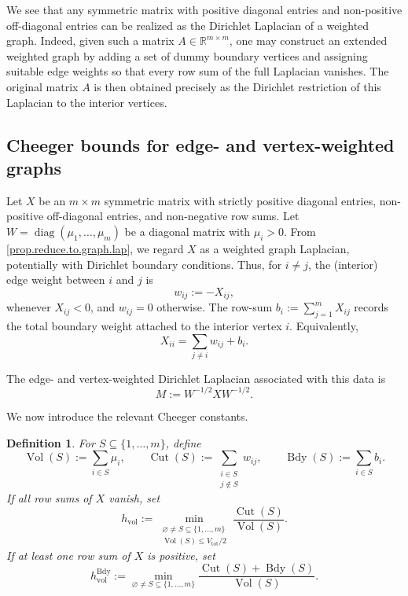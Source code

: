 \documentclass{article}
\newtheorem{definition}{Definition}[section]
\begin{document}
We see that 
any symmetric matrix with positive diagonal entries and non-positive 
off-diagonal entries can be realized as the Dirichlet Laplacian of a 
weighted graph. Indeed, given such a matrix $A \in \mathbb{R}^{m \times m}$, 
one may construct an extended weighted graph by adding a set of dummy 
boundary vertices and assigning suitable edge weights so that every row sum 
of the full Laplacian vanishes. The original matrix $A$ is then obtained 
precisely as the Dirichlet restriction of this Laplacian to the interior 
vertices. 

\subsection{Cheeger bounds for edge- and vertex-weighted graphs}
Let \(X\) be an \(m\times m\) symmetric matrix with strictly positive diagonal entries, non-positive off-diagonal entries, and non-negative row sums. Let \(W=\operatorname{diag}(\mu_1,\ldots,\mu_m)\) be a diagonal matrix with \(\mu_i>0\). From \cref{prop.reduce.to.graph.lap}, we regard \(X\) as a weighted graph Laplacian, potentially with Dirichlet boundary conditions. Thus, for \(i\neq j\), the (interior) edge weight between \(i\) and \(j\) is
\[
w_{ij}:=-X_{ij},
\]
whenever \(X_{ij}<0\), and \(w_{ij}=0\) otherwise. The row-sum $
b_i:=\sum_{j=1}^m X_{ij}$ records the total boundary weight attached to the interior vertex \(i\). Equivalently,
\[
X_{ii}=\sum_{j\neq i}w_{ij}+b_i.
\]

The edge- and vertex-weighted Dirichlet Laplacian associated with this data is
\[
M:=W^{-1/2}XW^{-1/2}.
\]

We now introduce the relevant Cheeger constants. 

\begin{definition}

For \(S\subseteq \{1,\ldots,m\}\), define
\[
\operatorname{Vol}(S):=\sum_{i\in S}\mu_i,\qquad
\operatorname{Cut}(S):=\sum_{\substack{i\in S\\ j\notin S}}w_{ij},\qquad
\operatorname{Bdy}(S):=\sum_{i\in S}b_i.
\]
If all row sums of \(X\) vanish, set
\[
h_{\mathrm{vol}}:=
\min_{\substack{\varnothing\neq S\subseteq \{1,\ldots,m\}\\ \operatorname{Vol}(S)\leq V_{\mathrm{tot}}/2}}
\frac{\operatorname{Cut}(S)}{\operatorname{Vol}(S)}.
\]
If at least one row sum of \(X\) is positive, set
\[
h_{\mathrm{vol}}^{\mathrm{Bdy}}:=
\min_{\varnothing\neq S\subseteq \{1,\ldots,m\}}
\frac{\operatorname{Cut}(S)+\operatorname{Bdy}(S)}{\operatorname{Vol}(S)}.
\]
\end{definition}
\end{document}
